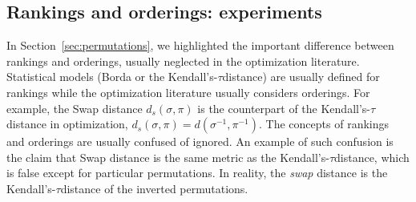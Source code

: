 \documentclass[sigconf,dvipsnames]{acmart}
\newcommand{\supplement}{\href{http://doi.org/10.5281/zenodo.4500974}{doi:~10.5281/zenodo.4500974}}
\newcommand{\ken}{Kendall's-$\tau$}
\begin{document}

\newcommand{\CEGOorig}{CEGO$_\text{ori}$\xspace}
\newcommand{\CEGOinv}{CEGO$_\text{inv}$\xspace}

\subsection{Rankings and orderings: experiments}\label{sec:exper_ro}

In Section~\ref{sec:permutations}, we highlighted the important difference between rankings and orderings, usually neglected in the optimization literature. Statistical models (Borda or the \ken distance) are usually defined for rankings while the optimization literature usually considers orderings. For example, the Swap distance $d_s(\sigma,\pi)$ is the counterpart of the  \ken distance  in optimization, $d_s(\sigma,\pi) = d(\sigma^{-1}, \pi^{-1})$. The concepts of rankings and orderings are usually confused of ignored. An example of such confusion is the claim that Swap distance is the same metric as  the \ken distance, which is false except for particular permutations. In reality, the \emph{swap} distance is the \ken distance of the inverted permutations.
\end{document}
